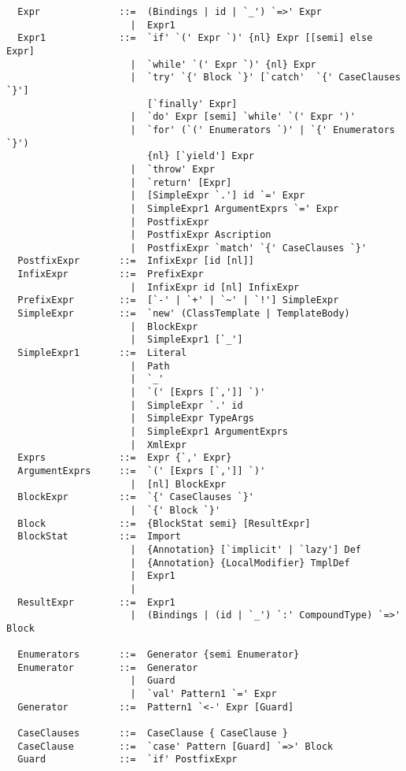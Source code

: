 {\begin{lstlisting}
  Expr              ::=  (Bindings | id | `_') `=>' Expr
                      |  Expr1
  Expr1             ::=  `if' `(' Expr `)' {nl} Expr [[semi] else Expr]
                      |  `while' `(' Expr `)' {nl} Expr
                      |  `try' `{' Block `}' [`catch'  `{' CaseClauses `}'] 
                         [`finally' Expr]
                      |  `do' Expr [semi] `while' `(' Expr ')'
                      |  `for' (`(' Enumerators `)' | `{' Enumerators `}') 
                         {nl} [`yield'] Expr
                      |  `throw' Expr
                      |  `return' [Expr]
                      |  [SimpleExpr `.'] id `=' Expr
                      |  SimpleExpr1 ArgumentExprs `=' Expr
                      |  PostfixExpr
                      |  PostfixExpr Ascription
                      |  PostfixExpr `match' `{' CaseClauses `}'
  PostfixExpr       ::=  InfixExpr [id [nl]]
  InfixExpr         ::=  PrefixExpr
                      |  InfixExpr id [nl] InfixExpr
  PrefixExpr        ::=  [`-' | `+' | `~' | `!'] SimpleExpr 
  SimpleExpr        ::=  `new' (ClassTemplate | TemplateBody)
                      |  BlockExpr
                      |  SimpleExpr1 [`_']
  SimpleExpr1       ::=  Literal
                      |  Path
                      |  `_'
                      |  `(' [Exprs [`,']] `)'
                      |  SimpleExpr `.' id 
                      |  SimpleExpr TypeArgs
                      |  SimpleExpr1 ArgumentExprs
                      |  XmlExpr
  Exprs             ::=  Expr {`,' Expr}
  ArgumentExprs     ::=  `(' [Exprs [`,']] `)'
                      |  [nl] BlockExpr
  BlockExpr         ::=  `{' CaseClauses `}'
                      |  `{' Block `}'
  Block             ::=  {BlockStat semi} [ResultExpr]
  BlockStat         ::=  Import
                      |  {Annotation} [`implicit' | `lazy'] Def
                      |  {Annotation} {LocalModifier} TmplDef
                      |  Expr1
                      |
  ResultExpr        ::=  Expr1
                      |  (Bindings | (id | `_') `:' CompoundType) `=>' Block

  Enumerators       ::=  Generator {semi Enumerator}
  Enumerator        ::=  Generator
                      |  Guard
                      |  `val' Pattern1 `=' Expr
  Generator         ::=  Pattern1 `<-' Expr [Guard]

  CaseClauses       ::=  CaseClause { CaseClause }
  CaseClause        ::=  `case' Pattern [Guard] `=>' Block 
  Guard             ::=  `if' PostfixExpr


\end{lstlisting}}
